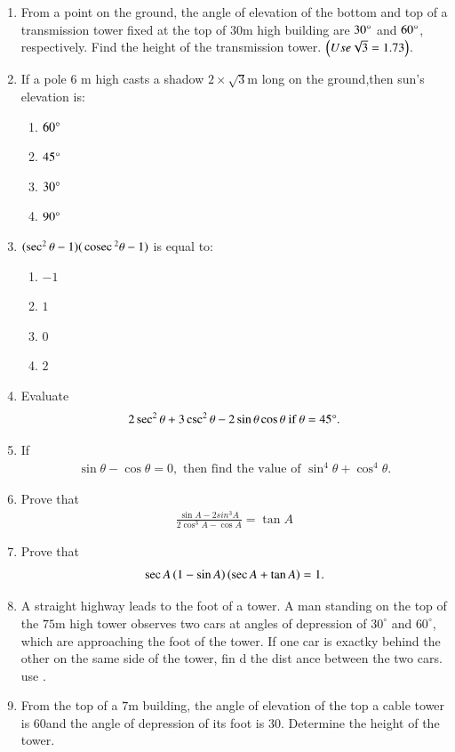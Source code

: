 \begin{enumerate}
\hfill{}\item From a point on the ground, the angle of elevation of the bottom and top of a transmission tower fixed at the top of $30 \mathrm{m}$ high building are $30\degree$ and $60\degree$, respectively. Find the height of the transmission tower. $\left(Use\sqrt{3} = 1.73\right)$.
	\hfill{}\item If a pole 6 m high casts a shadow $2 \times \sqrt{3}$m long on the ground,then sun's elevation is:
	\begin{enumerate}
\item $60\degree$
\item $45\degree$
\item $30\degree$
\item $90\degree$
	\end{enumerate}
 \hfill{}\item $ (\sec^2 \theta - 1)(\,\text{cosec}\,^2 \theta - 1)$
is equal to:
\begin{enumerate}
\item $-1$
\item $1$
\item $0$
\item $2$
\end{enumerate}

\hfill{}\item
Evaluate \begin{align}
2\sec^2\theta + 3\csc^2\theta - 2\sin\theta\cos\theta  \ \text{if} \ \theta = 45\degree.
\end{align}
\hfill{}\item 
If \begin{align} 
\sin\theta - \cos\theta = 0, \text{ then find the value of }\sin^4\theta + \cos^4\theta.
\end{align}
\hfill{}\item
Prove that \begin{align} \frac{\sin{A}-2sin^3{A}}{2\cos^3{A}-\cos{A}}=\tan{A} \end{align}
\hfill{}\item
Prove that \begin{align} \sec{A\ensuremath{\left(1-\sin{A}\right)}\ensuremath{\left(\sec{A}+\tan{A}\right)}}=1. \end{align}
\hfill{}\item
	A straight highway leads to the foot of a tower. A man standing on the top of the $75 \mathrm{m}$ high tower observes two cars at angles of depression of $30^\circ$ and $60^\circ$, which are approaching the foot of the tower. If one car is exactky behind the other on the same side of the tower, fin
d the dist
ance between the two cars. use .
\hfill{}\item
	From the top of a $7 \mathrm{m}$ building, the angle of elevation of the top a cable tower is 60\degree and the angle of depression of its foot is 30\degree. Determine the height of the tower.

\hfill{}

\end{enumerate}
